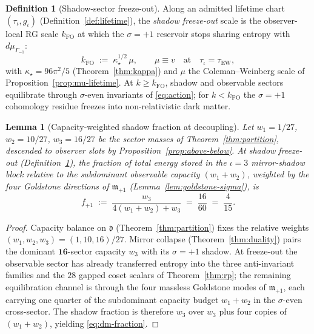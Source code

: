 \documentclass[aps,prd,onecolumn,amsmath,amssymb,nofootinbib,11pt]{revtex4-2}
\numberwithin{equation}{section}
\theoremstyle{plain}
\newtheorem{lemma}[theorem]{Lemma}
\theoremstyle{definition}
\newtheorem{definition}[theorem]{Definition}
\theoremstyle{remark}
\begin{document}
\begin{definition}[Shadow-sector freeze-out]\label{def:dm-freezeout}
Along an admitted lifetime chart $(\tau_\iota,g_\iota)$
(Definition~\ref{def:lifetime}), the \emph{shadow freeze-out} scale is the
observer-local RG scale $k_{\mathrm{FO}}$ at which the $\sigma=+1$ reservoir
stops sharing entropy with $d\mu_{\Gamma_{-1}}$:
\begin{equation}\label{eq:dm-freezeout}
  k_{\mathrm{FO}}
  \;:=\;
  \kappa_\star^{1/2}\,\mu,
  \qquad
  \mu\equiv v
  \quad\text{at}\quad
  \tau_\iota=\tau_{\mathrm{EW}},
\end{equation}
with $\kappa_\star=96\pi^2/5$ (Theorem~\ref{thm:kappa}) and $\mu$ the
Coleman--Weinberg scale of Proposition~\ref{prop:mu-lifetime}. At
$k\geq k_{\mathrm{FO}}$, shadow and observable sectors equilibrate through
$\sigma$-even invariants of \eqref{eq:action}; for $k<k_{\mathrm{FO}}$ the
$\sigma=+1$ cohomology residue freezes into non-relativistic dark matter.
\end{definition}

\begin{lemma}[Capacity-weighted shadow fraction at decoupling]
\label{lem:dm-capacity-fraction}
Let $w_1=1/27$, $w_2=10/27$, $w_3=16/27$ be the sector masses of
Theorem~\ref{thm:partition}, descended to observer slots by
Proposition~\ref{prop:above-below}. At shadow freeze-out
(Definition~\ref{def:dm-freezeout}), the fraction of total energy stored in the
$\iota=3$ mirror-shadow block relative to the subdominant observable capacity
$(w_1+w_2)$, weighted by the four Goldstone directions of
$\mathfrak{m}_{+1}$ (Lemma~\ref{lem:goldstone-sigma}), is
\begin{equation}\label{eq:dm-fraction}
  f_{+1}
  \;:=\;
  \frac{w_3}{4(w_1+w_2)+w_3}
  \;=\;
  \frac{16}{60}
  \;=\;
  \frac{4}{15}.
\end{equation}
\end{lemma}

\begin{proof}
Capacity balance on $\mathfrak{d}$ (Theorem~\ref{thm:partition}) fixes the
relative weights $(w_1,w_2,w_3)=(1,10,16)/27$. Mirror collapse
(Theorem~\ref{thm:duality}) pairs the dominant $\mathbf{16}$-sector capacity
$w_3$ with its $\sigma=+1$ shadow. At freeze-out the observable sector has
already transferred entropy into the three anti-invariant families and the
$28$ gapped coset scalars of Theorem~\ref{thm:rp}; the remaining
equilibration channel is through the four massless Goldstone modes of
$\mathfrak{m}_{+1}$, each carrying one quarter of the subdominant capacity
budget $w_1+w_2$ in the $\sigma$-even cross-sector. The shadow fraction is
therefore $w_3$ over $w_3$ plus four copies of $(w_1+w_2)$, yielding
\eqref{eq:dm-fraction}.
\end{proof}
\end{document}

